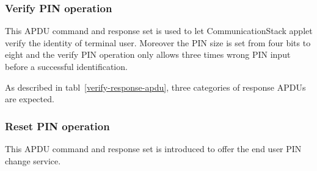 \subsubsection{Verify PIN operation}
This APDU command and response set is used to let CommunicationStack applet verify the identity of terminal user. Moreover the PIN size is set from four bits to eight and the verify PIN operation only allows three times wrong PIN input before a successful identification.

\begin{table}[!htb]
\caption{Verify PIN command }
\label{verify-command-apdu}
\end{table}

As described in tabl~\ref{verify-response-apdu}, three categories of response APDUs are expected.

\begin{table}[!htb]
\caption{Verify PIN response APDU}
\label{verify-response-apdu}
\end{table}

\subsubsection{Reset PIN operation}
This APDU command and response set is introduced to offer the end user PIN change service.

\begin{table}[!htb]
\caption{Reset PIN command }
\label{reset-pin-command-apdu}
\end{table}

